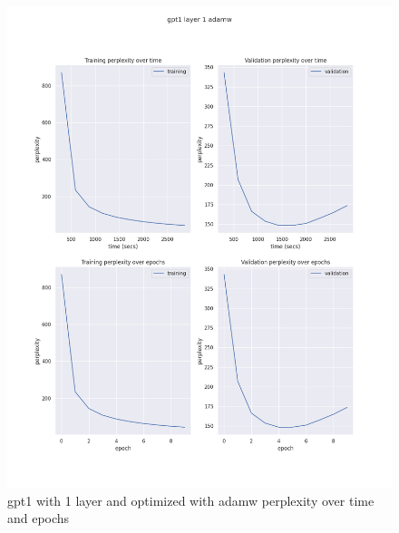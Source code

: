 \documentclass[12pt]{article}
\theoremstyle{definition}
\begin{document}
\begin{figure}[H]
     \centering
     \includegraphics[scale=0.4]{gpt1_layer_1_adamw.png}
     \caption{gpt1 with 1 layer and optimized with adamw perplexity over time and epochs}
\end{figure}
\end{document}
